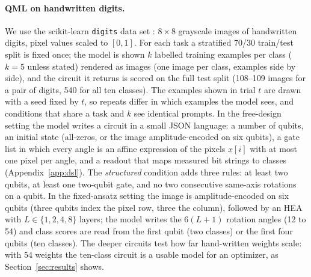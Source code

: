 \paragraph{QML on handwritten digits.}
We use the scikit-learn \texttt{digits} data set \citep{pedregosa2011scikit}: $8\times 8$ grayscale images of handwritten digits, pixel values scaled to $[0, 1]$. For each task a stratified 70/30 train/test split is fixed once; the model is shown $k$ labelled training examples per class ($k = 5$ unless stated) rendered as images (one image per class, examples side by side), and the circuit it returns is scored on the full test split (108--109 images for a pair of digits, 540 for all ten classes). The examples shown in trial $t$ are drawn with a seed fixed by $t$, so repeats differ in which examples the model sees, and conditions that share a task and $k$ see identical prompts. In the free-design setting the model writes a circuit in a small JSON language: a number of qubits, an initial state (all-zeros, or the image amplitude-encoded on six qubits), a gate list in which every angle is an affine expression of the pixels $x[i]$ with at most one pixel per angle, and a readout that maps measured bit strings to classes (Appendix~\ref{app:dsl}). The \emph{structured} condition adds three rules: at least two qubits, at least one two-qubit gate, and no two consecutive same-axis rotations on a qubit. In the fixed-ansatz setting the image is amplitude-encoded on six qubits (three qubits index the pixel row, three the column), followed by an HEA with $L \in \{1, 2, 4, 8\}$ layers; the model writes the $6(L{+}1)$ rotation angles (12 to 54) and class scores are read from the first qubit (two classes) or the first four qubits (ten classes). The deeper circuits test how far hand-written weights scale: with 54 weights the ten-class circuit is a usable model for an optimizer, as Section~\ref{sec:results} shows.

